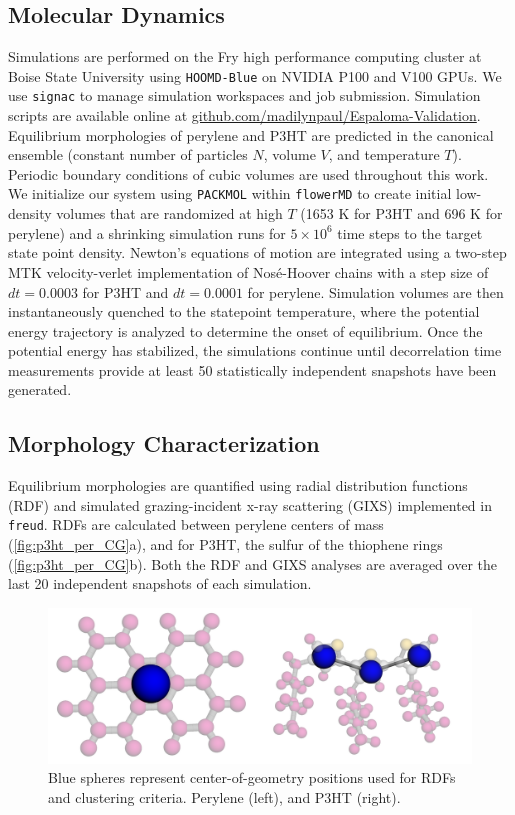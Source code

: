 \subsection{Molecular Dynamics}
Simulations are performed on the Fry high performance computing cluster at Boise State University using \texttt{HOOMD-Blue} on NVIDIA P100 and V100 GPUs. 
We use \texttt{signac}\citep{adorf_simple_2018} to manage simulation workspaces and job submission.
Simulation scripts are available online at \url{github.com/madilynpaul/Espaloma-Validation}. 
Equilibrium morphologies of perylene and P3HT are predicted in the canonical ensemble (constant number of particles $N$, volume $V$, and temperature $T$).
Periodic boundary conditions of cubic volumes are used throughout this work.
We initialize our system using \texttt{PACKMOL}\cite{martinez_p_2009} within \texttt{flowerMD}\cite{Albooyeh2023} to create initial low-density volumes that are randomized at high $T$ (1653 K for P3HT and 696 K for perylene) and a shrinking simulation runs for $5 \times 10^6$ time steps to the target state point density.
Newton's equations of motion are integrated using a two-step MTK velocity-verlet implementation of Nosé-Hoover chains\cite{martyna_constant_1994,cao_adiabatic_1996} with a step size of $dt=0.0003$ for P3HT and $dt=0.0001$ for perylene. 
Simulation volumes are then instantaneously quenched to the statepoint temperature, where the potential energy trajectory is analyzed to determine the onset of equilibrium.
Once the potential energy has stabilized, the simulations continue until decorrelation time measurements provide at least 50 statistically independent snapshots have been generated.

\subsection{Morphology Characterization}
Equilibrium morphologies are quantified using radial distribution functions (RDF) and simulated grazing-incident x-ray scattering (GIXS) implemented in \texttt{freud}\cite{freud2020}.
RDFs are calculated between perylene centers of mass (\autoref{fig:p3ht_per_CG}a), and for P3HT, the sulfur of the thiophene rings (\autoref{fig:p3ht_per_CG}b).
Both the RDF and GIXS analyses are averaged over the last 20 independent snapshots of each simulation.
\begin{figure}
    \centering
    \includegraphics[width=.6\linewidth]{src/figures/FF_figs/per_p3ht_CG.png}
    \caption{Blue spheres represent center-of-geometry positions used for RDFs and clustering criteria. Perylene (left), and P3HT (right).}
    \label{fig:p3ht_per_CG}
\end{figure}

